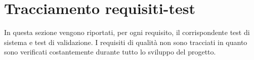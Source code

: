 %


\section{Tracciamento requisiti-test}
In questa sezione vengono riportati, per ogni requisito, il corrispondente test di
sistema e test di validazione. I requisiti di qualità non sono tracciati in quanto sono verificati
costantemente durante tutto lo sviluppo del progetto.



